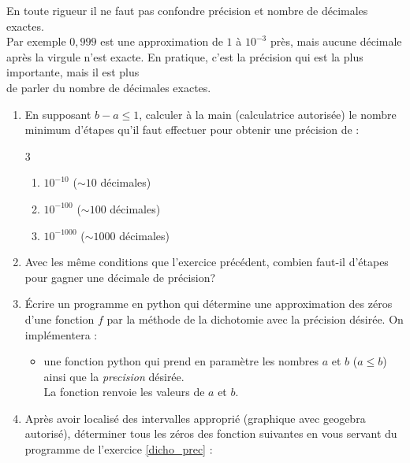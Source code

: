 \bigskip
\begin{remarque}
En toute rigueur il ne faut pas confondre précision et nombre de décimales exactes.\\
Par exemple $0,999$ est une approximation de $1$ à $10^{-3}$ près, mais aucune
décimale après la virgule n'est exacte.  En pratique, c'est la précision qui est la plus importante, mais il est plus\\  de parler du nombre de décimales exactes.
\end{remarque}





\bigskip
\begin{boxexstheorieligne}
\begin{enumerate}[label=\textbf{E\thechapter.\arabic*},itemsep=4mm,resume=refexercices]
\item En supposant $b-a\leqslant 1$, calculer à la main (calculatrice autorisée) le nombre minimum d'étapes qu'il faut effectuer pour obtenir une précision de :
\begin{multicols}{3}
\begin{enumerate}[label=\roman*)]
\item $10^{-10}$ {\footnotesize($\sim 10$ décimales)}
\item $10^{-100}$ {\footnotesize($\sim 100$ décimales)}
\item $10^{-1000}$ {\footnotesize($\sim 1000$ décimales)}
\end{enumerate}
\end{multicols}
\item Avec les même conditions que l'exercice précédent, combien faut-il d'étapes pour gagner une décimale de précision? 
\item\label{dicho_prec} Écrire un programme en python qui détermine une approximation des zéros d'une fonction $f$ par la méthode de la dichotomie avec la précision désirée. On implémentera :
\vspace{-1mm} 
\begin{itemize}
\item une fonction python  qui prend en paramètre les nombres $a$ et $b$ ($a\leqslant b$) ainsi que la \textit{precision} désirée.\\
La fonction renvoie les valeurs de $a$ et $b$.
\end{itemize}
\item Après avoir localisé des intervalles approprié (graphique avec geogebra autorisé), déterminer tous les zéros des fonction suivantes en vous servant du programme de l'exercice \ref*{dicho_prec} :

\end{enumerate}
\end{boxexstheorieligne}
